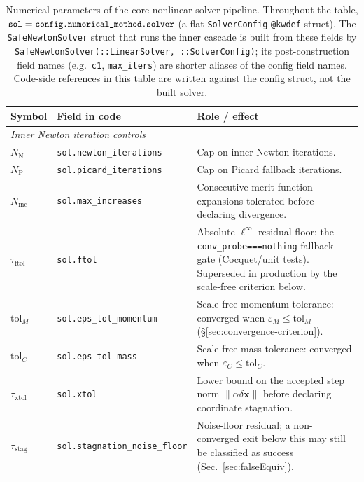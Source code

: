 \documentclass{article}
\newcommand{\code}[1]{\texttt{\small #1}}
\newcommand{\textftol}{\tau_{\mathrm{ftol}}}
\newcommand{\textstag}{\tau_{\mathrm{stag}}}
\newcommand{\textxtol}{\tau_{\mathrm{xtol}}}
\begin{document}
\begin{table}[h]
\centering
\caption{Numerical parameters of the core nonlinear-solver pipeline.
Throughout the table, $\code{sol} = \code{config.numerical\_method.solver}$
(a flat \code{SolverConfig} \code{@kwdef} struct). The
\code{SafeNewtonSolver} struct that runs the inner cascade is built from
these fields by \code{SafeNewtonSolver(::LinearSolver, ::SolverConfig)};
its post-construction field names (e.g.\ \code{c1}, \code{max\_iters})
are shorter aliases of the config field names. Code-side references in
this table are written against the config struct, not the built solver.}
\label{tab:params}
\footnotesize
\begin{tabularx}{\textwidth}{@{} l l X @{}}
\toprule
\textbf{Symbol} & \textbf{Field in code} & \textbf{Role / effect} \\
\midrule
\multicolumn{3}{l}{\emph{Inner Newton iteration controls}} \\
$N_{\mathrm{N}}$         & \code{sol.newton\_iterations}           & Cap on inner Newton iterations. \\
$N_{\mathrm{P}}$         & \code{sol.picard\_iterations}           & Cap on Picard fallback iterations. \\
$N_{\mathrm{inc}}$       & \code{sol.max\_increases}               & Consecutive merit-function expansions tolerated before declaring divergence. \\
$\textftol$              & \code{sol.ftol}                          & Absolute $\ell^\infty$ residual floor; the \code{conv\_probe===nothing} fallback gate (Cocquet/unit tests). Superseded in production by the scale-free criterion below. \\
$\mathrm{tol}_M$         & \code{sol.eps\_tol\_momentum}            & Scale-free momentum tolerance: converged when $\varepsilon_M\le\mathrm{tol}_M$ (§\ref{sec:convergence-criterion}). \\
$\mathrm{tol}_C$         & \code{sol.eps\_tol\_mass}                & Scale-free mass tolerance: converged when $\varepsilon_C\le\mathrm{tol}_C$. \\
$\textxtol$              & \code{sol.xtol}                          & Lower bound on the accepted step norm $\|\alpha\delta\boldsymbol{x}\|$ before declaring coordinate stagnation. \\
$\textstag$              & \code{sol.stagnation\_noise\_floor}      & Noise-floor residual; a non-converged exit below this may still be classified as success (Sec.~\ref{sec:falseEquiv}). \\

\end{tabularx}
\end{table}
\end{document}
